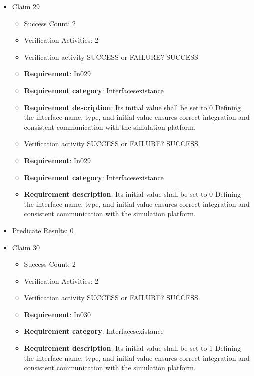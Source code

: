 \documentclass{article}
\begin{document}
\begin{itemize}
  				  \item Claim 29
				\begin{itemize}
			    	\item Success Count: 2 
			    	\item Verification Activities: 2
					\item Verification activity SUCCESS or FAILURE? SUCCESS
		
						\item \textbf{Requirement}: In029 
						\item \textbf{Requirement category}: Interfacesexistance 
						\item \textbf{Requirement description}: Its initial value shall be set to 0 Defining the interface name, type, and initial value ensures correct integration and consistent communication with the simulation platform.
					
					\item Verification activity SUCCESS or FAILURE? SUCCESS
		
						\item \textbf{Requirement}: In029 
						\item \textbf{Requirement category}: Interfacesexistance 
						\item \textbf{Requirement description}: Its initial value shall be set to 0 Defining the interface name, type, and initial value ensures correct integration and consistent communication with the simulation platform.
					
				\end{itemize}
				
									    
				\item Predicate Results: 0

  				  \item Claim 30
				\begin{itemize}
			    	\item Success Count: 2 
			    	\item Verification Activities: 2
					\item Verification activity SUCCESS or FAILURE? SUCCESS
		
						\item \textbf{Requirement}: In030 
						\item \textbf{Requirement category}: Interfacesexistance 
						\item \textbf{Requirement description}: Its initial value shall be set to 1 Defining the interface name, type, and initial value ensures correct integration and consistent communication with the simulation platform.
					

\end{itemize}
\end{itemize}
\end{document}
